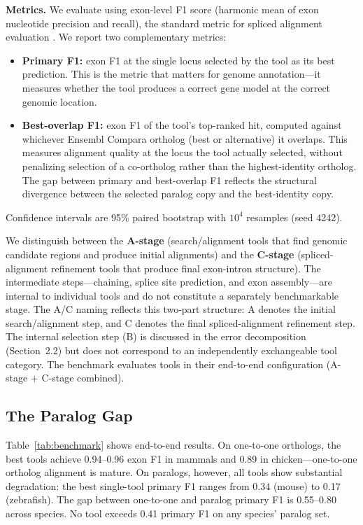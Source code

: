 \textbf{Metrics.} We evaluate using exon-level F1 score (harmonic mean of exon nucleotide precision and recall), the standard metric for spliced alignment evaluation \cite{burset1996evaluation}. We report two complementary metrics:
\begin{itemize}
    \item \textbf{Primary F1:} exon F1 at the single locus selected by the tool as its best prediction. This is the metric that matters for genome annotation---it measures whether the tool produces a correct gene model at the correct genomic location.
    \item \textbf{Best-overlap F1:} exon F1 of the tool's top-ranked hit, computed against whichever Ensembl Compara ortholog (best or alternative) it overlaps. This measures alignment quality at the locus the tool actually selected, without penalizing selection of a co-ortholog rather than the highest-identity ortholog. The gap between primary and best-overlap F1 reflects the structural divergence between the selected paralog copy and the best-identity copy.
\end{itemize}
Confidence intervals are 95\% paired bootstrap with $10^4$ resamples (seed 4242).

We distinguish between the \textbf{A-stage} (search/alignment tools that find genomic candidate regions and produce initial alignments) and the \textbf{C-stage} (spliced-alignment refinement tools that produce final exon-intron structure). The intermediate steps—chaining, splice site prediction, and exon assembly—are internal to individual tools and do not constitute a separately benchmarkable stage. The A/C naming reflects this two-part structure: A denotes the initial search/alignment step, and C denotes the final spliced-alignment refinement step. The internal selection step (B) is discussed in the error decomposition (Section~2.2) but does not correspond to an independently exchangeable tool category. The benchmark evaluates tools in their end-to-end configuration (A-stage + C-stage combined).

\subsection{The Paralog Gap}

Table~\ref{tab:benchmark} shows end-to-end results. On one-to-one orthologs, the best tools achieve 0.94--0.96 exon F1 in mammals and 0.89 in chicken---one-to-one ortholog alignment is mature. On paralogs, however, all tools show substantial degradation: the best single-tool primary F1 ranges from 0.34 (mouse) to 0.17 (zebrafish). The gap between one-to-one and paralog primary F1 is 0.55--0.80 across species. No tool exceeds 0.41 primary F1 on any species' paralog set.

